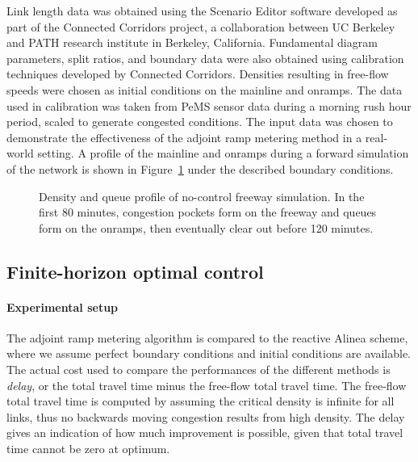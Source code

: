 Link length data was obtained using the Scenario Editor software developed
as part of the Connected Corridors project, a collaboration between
UC Berkeley and PATH research institute in Berkeley, California.
Fundamental diagram parameters, split ratios, and boundary data were
also obtained using calibration techniques developed by Connected
Corridors. Densities resulting in free-flow speeds were chosen as
initial conditions on the mainline and onramps. The data used in calibration
was taken from PeMS sensor data during a morning rush hour period,
scaled to generate congested conditions. The input data was chosen
to demonstrate the effectiveness of the adjoint ramp metering method
in a real-world setting. A profile of the mainline and onramps during
a forward simulation of the network is shown in Figure~\ref{fig:Density-and-queue}
under the described boundary conditions.
\begin{figure}[b]
\hfill{}

\caption{Density and queue profile of no-control freeway simulation. In the
first 80 minutes, congestion pockets form on the freeway and queues
form on the onramps, then eventually clear out before 120 minutes.\label{fig:Density-and-queue}}
\end{figure}



\subsection{Finite-horizon optimal control\label{sub:Finite-horizon-optimal-control}}


\paragraph{Experimental setup}

The adjoint ramp metering algorithm is compared to the reactive Alinea
scheme, where we assume perfect boundary conditions and initial conditions
are available. The actual cost used to compare the performances of
the different methods is \emph{delay}, or the total travel time minus
the free-flow total travel time. The free-flow total travel time is
computed by assuming the critical density is infinite for all links,
thus no backwards moving congestion results from high density. The
delay gives an indication of how much improvement is possible, given
that total travel time cannot be zero at optimum.


